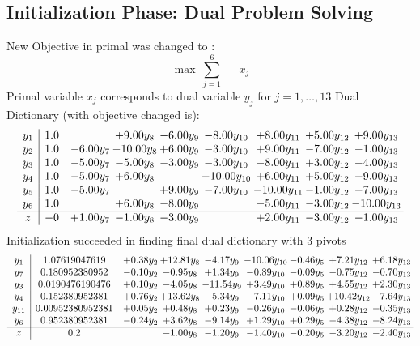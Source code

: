 \documentclass[9pt]{article}
\begin{document}
\subsection{Initialization Phase: Dual Problem Solving}
New Objective in primal was changed to : \[ \max\ \sum_{j=1}^{6}\ - x_j \] 
Primal variable $x_j$ corresponds to dual variable $y_j$ for $j = 1,\ldots,13$
Dual Dictionary (with objective changed is): 
\[\begin{array}{c| c c@{\hskip 2pt} c@{\hskip 2pt} c@{\hskip 2pt} c@{\hskip 2pt} c@{\hskip 2pt} c@{\hskip 2pt} c@{\hskip 2pt} }
 y_{1}   &  1.0  &   & +  9.00 y_{8} & -6.00 y_{9} & -8.00 y_{10} & +  8.00 y_{11} & +  5.00 y_{12} & +  9.00 y_{13}\\
 y_{2}   &  1.0 & -6.00 y_{7} & -10.00 y_{8} & +  6.00 y_{9} & -3.00 y_{10} & +  9.00 y_{11} & -7.00 y_{12} & -1.00 y_{13}\\
 y_{3}   &  1.0 & -5.00 y_{7} & -5.00 y_{8} & -3.00 y_{9} & -3.00 y_{10} & -8.00 y_{11} & +  3.00 y_{12} & -4.00 y_{13}\\
 y_{4}   &  1.0 & -5.00 y_{7} & +  6.00 y_{8} &   & -10.00 y_{10} & +  6.00 y_{11} & +  5.00 y_{12} & -9.00 y_{13}\\
 y_{5}   &  1.0 & -5.00 y_{7} &   & +  9.00 y_{9} & -7.00 y_{10} & -10.00 y_{11} & -1.00 y_{12} & -7.00 y_{13}\\
 y_{6}   &  1.0  &   & +  6.00 y_{8} & -8.00 y_{9} &   & -5.00 y_{11} & -3.00 y_{12} & -10.00 y_{13}\\
\hline
z    &  -0 & +  1.00 y_{7} & -1.00 y_{8} & -3.00 y_{9} &   & +  2.00 y_{11} & -3.00 y_{12} & -1.00 y_{13}\\
\end{array}\]
Initialization succeeded in finding final dual dictionary with 3 pivots
\[\begin{array}{c| c c@{\hskip 2pt} c@{\hskip 2pt} c@{\hskip 2pt} c@{\hskip 2pt} c@{\hskip 2pt} c@{\hskip 2pt} c@{\hskip 2pt} }
 y_{1}   &  1.07619047619 & +  0.38 y_{2} & + 12.81 y_{8} & -4.17 y_{9} & -10.06 y_{10} & -0.46 y_{5} & +  7.21 y_{12} & +  6.18 y_{13}\\
 y_{7}   &  0.180952380952 & -0.10 y_{2} & -0.95 y_{8} & +  1.34 y_{9} & -0.89 y_{10} & -0.09 y_{5} & -0.75 y_{12} & -0.70 y_{13}\\
 y_{3}   &  0.0190476190476 & +  0.10 y_{2} & -4.05 y_{8} & -11.54 y_{9} & +  3.49 y_{10} & +  0.89 y_{5} & +  4.55 y_{12} & +  2.30 y_{13}\\
 y_{4}   &  0.152380952381 & +  0.76 y_{2} & + 13.62 y_{8} & -5.34 y_{9} & -7.11 y_{10} & +  0.09 y_{5} & + 10.42 y_{12} & -7.64 y_{13}\\
 y_{11}   &  0.00952380952381 & +  0.05 y_{2} & +  0.48 y_{8} & +  0.23 y_{9} & -0.26 y_{10} & -0.06 y_{5} & +  0.28 y_{12} & -0.35 y_{13}\\
 y_{6}   &  0.952380952381 & -0.24 y_{2} & +  3.62 y_{8} & -9.14 y_{9} & +  1.29 y_{10} & +  0.29 y_{5} & -4.38 y_{12} & -8.24 y_{13}\\
\hline
z    &  0.2  &   & -1.00 y_{8} & -1.20 y_{9} & -1.40 y_{10} & -0.20 y_{5} & -3.20 y_{12} & -2.40 y_{13}\\
\end{array}\]
\end{document}
